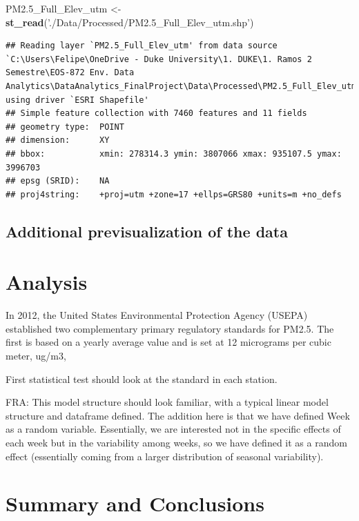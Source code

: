 \documentclass[12pt,]{article}
\newenvironment{Shaded}{\begin{snugshade}}{\end{snugshade}}
\newcommand{\KeywordTok}[1]{\textcolor[rgb]{0.13,0.29,0.53}{\textbf{#1}}}
\newcommand{\StringTok}[1]{\textcolor[rgb]{0.31,0.60,0.02}{#1}}
\newcommand{\NormalTok}[1]{#1}
\begin{document}
\begin{Shaded}
\begin{Highlighting}[]
\NormalTok{PM2.5_Full_Elev_utm <-}\StringTok{ }\KeywordTok{st_read}\NormalTok{(}\StringTok{'./Data/Processed/PM2.5_Full_Elev_utm.shp'}\NormalTok{) }
\end{Highlighting}
\end{Shaded}

\begin{verbatim}
## Reading layer `PM2.5_Full_Elev_utm' from data source `C:\Users\Felipe\OneDrive - Duke University\1. DUKE\1. Ramos 2 Semestre\EOS-872 Env. Data Analytics\DataAnalytics_FinalProject\Data\Processed\PM2.5_Full_Elev_utm.shp' using driver `ESRI Shapefile'
## Simple feature collection with 7460 features and 11 fields
## geometry type:  POINT
## dimension:      XY
## bbox:           xmin: 278314.3 ymin: 3807066 xmax: 935107.5 ymax: 3996703
## epsg (SRID):    NA
## proj4string:    +proj=utm +zone=17 +ellps=GRS80 +units=m +no_defs
\end{verbatim}

\subsection{Additional previsualization of the
data}\label{additional-previsualization-of-the-data}

\newpage

\section{Analysis}\label{analysis}

In 2012, the United States Environmental Protection Agency (USEPA)
established two complementary primary regulatory standards for PM2.5.
The first is based on a yearly average value and is set at 12 micrograms
per cubic meter, ug/m3,

First statistical test should look at the standard in each station.

FRA: This model structure should look familiar, with a typical linear
model structure and dataframe defined. The addition here is that we have
defined Week as a random variable. Essentially, we are interested not in
the specific effects of each week but in the variability among weeks, so
we have defined it as a random effect (essentially coming from a larger
distribution of seasonal variability).

\newpage

\section{Summary and Conclusions}\label{summary-and-conclusions}
\end{document}
